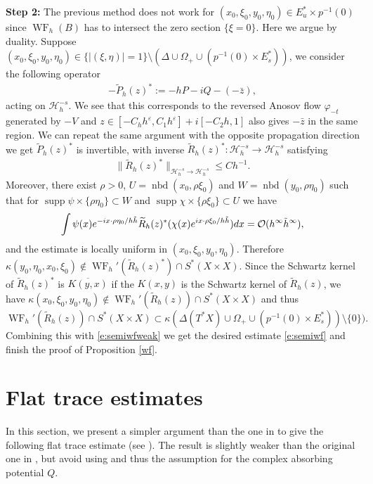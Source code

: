 \documentclass[reqno,12pt,letterpaper]{amsart}
\numberwithin{equation}{section}
\numberwithin{prop}{section}
\DeclareMathOperator{\supp}{supp}
\DeclareMathOperator{\nbd}{nbd}
\DeclareMathOperator{\WF}{WF}
\newcommand{\Hcal}{{\mathcal H}}
\begin{document}
\noindent\textbf{Step 2:} The previous method does not work for $(x_0,\xi_0,y_0,\eta_0)\in E_u^*\times p^{-1}(0)$ since $\WF_h(B)$ has to intersect the zero section $\{\xi=0\}$. Here we argue by duality.  Suppose $(x_0,\xi_0,y_0,\eta_0)\in  \{|(\xi,\eta)|= 1\}\setminus(\Delta\cup \Omega_+\cup(p^{-1}(0)\times E_s^*))$, we consider the following operator
\begin{align*}
    -\widetilde{P}_h(z)^*:=-hP-iQ-(-\bar{z}),
\end{align*}
acting on $\Hcal^{-s}_h$. We see that this corresponds to the reversed Anosov flow $\varphi_{-t}$ generated by $-V$ and $z\in[-C_hh^\varepsilon,C_1h^\varepsilon]+i[-C_2h,1]$ also gives $-\bar{z}$ in the same region. We can repeat the same argument with the opposite propagation direction we get $\widetilde{P}_h(z)^*$ is invertible, with inverse $\widetilde{R}_h(z)^*:\Hcal^{-s}_h\to\Hcal^{-s}_h$ satisfying
    \begin{align*}
        \|\widetilde{R}_h(z)^*\|_{\Hcal^{-s}_h\to\Hcal^{-s}_h}\leq Ch^{-1}.
    \end{align*}
Moreover, there exist $\rho>0$, $U=\nbd(x_0,\rho\xi_0)$ and $W=\nbd(y_0,\rho\eta_0)$ such that for $\supp\psi\times\{\rho\eta_0\}\subset W$ and $\supp\chi\times\{\rho\xi_0\}\subset U$ we have
    \begin{align*}
        \int\psi(x)e^{-ix\cdot\rho\eta_0/h\Tilde{h}}\widetilde{R}_h(z)^*(\chi(x)e^{ix\cdot\rho\xi_0/h\Tilde{h}})dx=\mathcal{O}(h^\infty\Tilde{h}^\infty),
    \end{align*}
and the estimate is locally uniform in $(x_0,\xi_0,y_0,\eta_0)$. Therefore $\kappa(y_0,\eta_0,x_0,\xi_0)\not\in \WF_h'(\widetilde{R}_h(z)^\ast)\cap S^\ast(X\times X)$. Since the Schwartz kernel of $\widetilde{R}_h(z)^\ast$ is $\overline{K(y,x)}$ if the $K(x,y)$ is the Schwartz kernel of $\widetilde{R}_h(z)$, we have $\kappa(x_0,\xi_0, y_0,\eta_0)\not\in \WF_h'(\widetilde{R}_h(z))\cap S^\ast(X\times X)$ and thus
$$\WF_h'(\widetilde{R}_h(z))\cap S^\ast(X\times X)\subset\kappa(\Delta(T^\ast X)\cup\Omega_+\cup(p^{-1}(0)\times E_s^\ast))\setminus\{0\}).$$
Combining this with \eqref{e:semiwfweak} we get the desired estimate \eqref{e:semiwf} and finish the proof of Proposition \ref{wf}.

\section{Flat trace estimates}
\label{s:flattrace}
In this section, we present a simpler argument than the one in \cite{local} to give the following flat trace estimate (see \cite[Proposition 3.1]{local}). The result is slightly weaker than the original one in \cite{local}, but avoid using \cite[Proposition 10.3]{nozw} and thus the assumption \cite[(2.7)]{local} for the complex absorbing potential $Q$.
\end{document}
